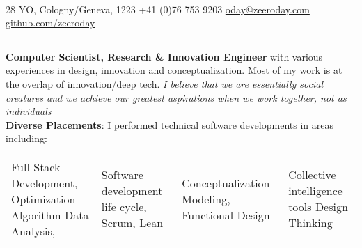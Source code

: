 \documentclass[a4paper, 10pt]{article}
\begin{document}

\begin{center}
\\
\vspace{2mm}
28 YO,\hfill {\small\faMapMarker} Cologny/Geneva, 1223 
\color{text1}{\large\Telefon} +41 (0)76 753 9203 
\hfill {\small\faEnvelope} \href{mailto:oday@zeeroday.com}{oday@zeeroday.com} 
\hfill \color{text1}{\large\faGithub} \href{https://github.com/zeeroday}{github.com/zeeroday}
\hfill\small{}

\rule{\textwidth}{.1pt}

\begin{flushleft}
	\textbf{Computer Scientist, Research \& Innovation Engineer}  with various experiences in design, innovation and conceptualization. Most of my work is at the overlap of innovation/deep tech. \textit{I believe that we are essentially social creatures and we achieve our greatest aspirations when we work together, not as individuals}\\ 
	\vspace{1.1mm}
\textbf{Diverse Placements}: I performed technical software developments in areas including:
\vspace{-6mm}
\end{flushleft}
\begin{tabularx}{\textwidth}{||X||X|| X|| X||}

		\rowcolor{Gray}
		Full Stack Development,  Optimization Algorithm Data Analysis, & 
		Software development life cycle, Scrum, Lean & 
		Conceptualization Modeling, Functional Design  & 
		Collective intelligence tools Design Thinking
\end{tabularx}

\FloatBarrier
{}

\end{center}
\end{document}
